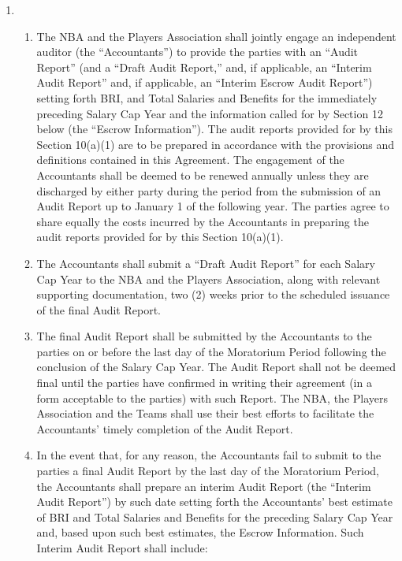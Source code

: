 \documentclass[
]{book}
\providecommand{\tightlist}{%
  \setlength{\itemsep}{0pt}\setlength{\parskip}{0pt}}
\begin{document}
\begin{enumerate}
\def\labelenumi{(\alph{enumi})}
\item
  \begin{enumerate}
  \def\labelenumii{(\arabic{enumii})}
  \tightlist
  \item
    The NBA and the Players Association shall jointly engage an independent auditor (the ``Accountants'') to provide the parties with an ``Audit Report'' (and a ``Draft Audit Report,'' and, if applicable, an ``Interim Audit Report'' and, if applicable, an ``Interim Escrow Audit Report'') setting forth BRI, and Total Salaries and Benefits for the immediately preceding Salary Cap Year and the information called for by Section 12 below (the ``Escrow Information''). The audit reports provided for by this Section 10(a)(1) are to be prepared in accordance with the provisions and definitions contained in this Agreement. The engagement of the Accountants shall be deemed to be renewed annually unless they are discharged by either party during the period from the submission of an Audit Report up to January 1 of the following year. The parties agree to share equally the costs incurred by the Accountants in preparing the audit reports provided for by this Section 10(a)(1).
  \item
    The Accountants shall submit a ``Draft Audit Report'' for each Salary Cap Year to the NBA and the Players Association, along with relevant supporting documentation, two (2) weeks prior to the scheduled issuance of the final Audit Report.
  \item
    The final Audit Report shall be submitted by the Accountants to the parties on or before the last day of the Moratorium Period following the conclusion of the Salary Cap Year. The Audit Report shall not be deemed final until the parties have confirmed in writing their agreement (in a form acceptable to the parties) with such Report. The NBA, the Players Association and the Teams shall use their best efforts to facilitate the Accountants' timely completion of the Audit Report.
  \item
    In the event that, for any reason, the Accountants fail to submit to the parties a final Audit Report by the last day of the Moratorium Period, the Accountants shall prepare an interim Audit Report (the ``Interim Audit Report'') by such date setting forth the Accountants' best estimate of BRI and Total Salaries and Benefits for the preceding Salary Cap Year and, based upon such best estimates, the Escrow Information. Such Interim Audit Report shall
    include:


\end{enumerate}
\end{enumerate}
\end{document}

